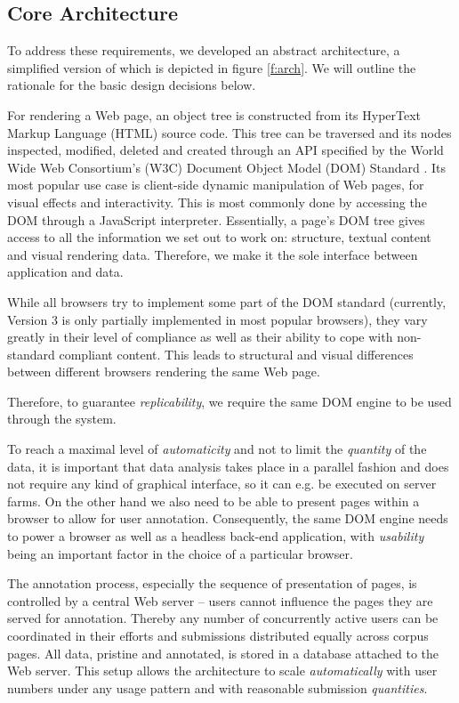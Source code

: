 \subsection{Core Architecture}

To address these requirements, we developed an abstract architecture, a simplified version of which is depicted in figure \ref{f:arch}.
We will outline the rationale for the basic design decisions below.


For rendering a Web page, an object tree is constructed from its HyperText Markup Language (HTML) source code.
This tree can be traversed and its nodes inspected, modified, deleted and created through an API specified by the World Wide Web Consortium's (W3C) Document Object Model (DOM) Standard \cite{dom}.
Its most popular use case is client-side dynamic manipulation of Web pages, for visual effects and interactivity.
This is most commonly done by accessing the DOM through a JavaScript interpreter.
Essentially, a page's DOM tree gives access to all the information we set out to work on: structure, textual content and visual rendering data.
Therefore, we make it the sole interface between application and data.

While all browsers try to implement some part of the DOM standard (currently, Version 3 is only partially implemented in most popular browsers), they vary greatly in their level of compliance as well as their ability to cope with non-standard compliant content.
This leads to structural and visual differences between different browsers rendering the same Web page.

Therefore, to guarantee \textit{replicability}, we require the same DOM engine to be used through the system.


To reach a maximal level of \textit{automaticity} and not to limit the \textit{quantity} of the data, it is important that data analysis takes place in a parallel fashion and does not require any kind of graphical interface, so it can e.g. be executed on server farms.
On the other hand we also need to be able to present pages within a browser to allow for user annotation.
Consequently, the same DOM engine needs to power a browser as well as a headless back-end application, with \textit{usability} being an important factor in the choice of a particular browser.


The annotation process, especially the sequence of presentation of pages, is controlled by a central Web server -- users cannot influence the pages they are served for annotation.
Thereby any number of concurrently active users can be coordinated in their efforts and submissions distributed equally across corpus pages.
All data, pristine and annotated, is stored in a database attached to the Web server.
This setup allows the architecture to scale \textit{automatically} with user numbers under any usage pattern and with reasonable submission \textit{quantities}.


